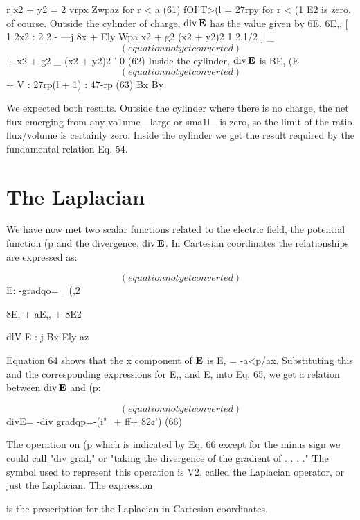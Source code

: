 r x2 + y2
= 2
vrpx Zwpaz for r < a (61)
 fOI'T>(l
= 27rpy for r < (1
E2 is zero, of course.
Outside the cylinder of charge, $\operatorname{div}\mathbf{E}$ has the value given by
6E, 6E,, [ 1 2x2
: 2 2 - ---j
8x + Ely Wpa x2 + g2 (x2 + y2)2
1 2.1/2 ] _
\begin{equation}
(equation not yet converted)
\end{equation}
+ x2 + g2 _ (x2 + y2)2 ' 0 (62)
Inside the cylinder, $\operatorname{div}\mathbf{E}$ is
BE, (E
\begin{equation}
(equation not yet converted)
\end{equation}
+ V : 27rp(l + 1) : 47-rp (63)
Bx By

We expected both results. Outside the cylinder where there is no
charge, the net flux emerging from any vo1ume---large or sma1l---is
zero, so the limit of the ratio flux/volume is certainly zero. Inside the
cylinder we get the result required by the fundamental relation Eq. 54.

\section{The Laplacian}

We have now met two scalar functions related to the electric field,
the potential function (p and the divergence, $\operatorname{div}\mathbf{E}$. In Cartesian coordinates
the relationships are expressed as:

\begin{equation}
(equation not yet converted)
\end{equation}
E: -gradqo= _(,2%

8E, + aE,, + 8E2

dlV E : j
Bx Ely az

Equation 64 shows that the x component of $\mathbf{E}$ is E, = -a<p/ax.
Substituting this and the corresponding expressions for E,, and E,
into Eq. 65, we get a relation between $\operatorname{div}\mathbf{E}$ and (p:

\begin{equation}
(equation not yet converted)
\end{equation}
divE= -div gradqp=-(i"_+ ff+ 82¢') (66)

The operation on (p which is indicated by Eq. 66 except for the minus
sign we could call "div grad," or "taking the divergence of the
gradient of . . . ." The symbol used to represent this operation is V2,
called the Laplacian operator, or just the Laplacian. The expression

is the prescription for the Laplacian in Cartesian coordinates.

